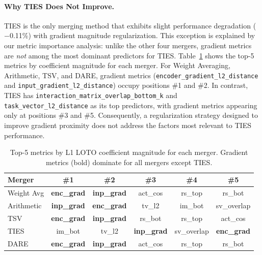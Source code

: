\paragraph{Why TIES Does Not Improve.}
TIES is the only merging method that exhibits slight performance degradation ($-$0.11\%) with gradient magnitude regularization. This exception is explained by our metric importance analysis: unlike the other four mergers, gradient metrics are \emph{not} among the most dominant predictors for TIES. Table~\ref{tab:metric_ranks} shows the top-5 metrics by coefficient magnitude for each merger. For Weight Averaging, Arithmetic, TSV, and DARE, gradient metrics (\texttt{encoder\_gradient\_l2\_distance} and \texttt{input\_gradient\_l2\_distance}) occupy positions \#1 and \#2. In contrast, TIES has \texttt{interaction\_matrix\_overlap\_bottom\_k} and \texttt{task\_vector\_l2\_distance} as its top predictors, with gradient metrics appearing only at positions \#3 and \#5. Consequently, a regularization strategy designed to improve gradient proximity does not address the factors most relevant to TIES performance.

\begin{table}[h]
\centering
\caption{Top-5 metrics by L1 LOTO coefficient magnitude for each merger. Gradient metrics (bold) dominate for all mergers except TIES.}
\label{tab:metric_ranks}
\small
\begin{tabular}{lccccc}
\toprule
\textbf{Merger} & \textbf{\#1} & \textbf{\#2} & \textbf{\#3} & \textbf{\#4} & \textbf{\#5} \\
\midrule
Weight Avg & \textbf{enc\_grad} & \textbf{inp\_grad} & act\_cos & rs\_top & rs\_bot \\
Arithmetic & \textbf{inp\_grad} & \textbf{enc\_grad} & tv\_l2 & im\_bot & sv\_overlap \\
TSV & \textbf{enc\_grad} & \textbf{inp\_grad} & rs\_bot & rs\_top & act\_cos \\
TIES & im\_bot & tv\_l2 & \textbf{inp\_grad} & sv\_overlap & \textbf{enc\_grad} \\
DARE & \textbf{enc\_grad} & \textbf{inp\_grad} & act\_cos & rs\_top & rs\_bot \\
\bottomrule
\end{tabular}
\end{table}

